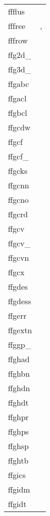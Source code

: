 \documentclass[11pt]{book}
\begin{document}
\begin{tabular}{lr}
ffflus     & \pageref{ffflus} \\
fffree     & \pageref{ffgkls},  \pageref{ffhdr2str} \\
fffrow    & \pageref{fffrow} \\
ffg2d\_      & \pageref{ffg2dx} \\
ffg3d\_      & \pageref{ffg3dx} \\
ffgabc      & \pageref{ffgabc} \\
ffgacl  & \pageref{ffgacl} \\
ffgbcl  & \pageref{ffgbcl} \\
ffgcdw  & \pageref{ffgcdw} \\
ffgcf    & \pageref{ffgcf} \\
ffgcf\_    & \pageref{ffgcfx} \\
ffgcks     & \pageref{ffgcks} \\
ffgcnn    & \pageref{ffgcnn} \\
ffgcno     & \pageref{ffgcno} \\
ffgcrd         & \pageref{ffgcrd} \\
ffgcv        & \pageref{ffgcv} \\
ffgcv\_    & \pageref{ffgcvx} \\
ffgcvn       & \pageref{ffgcvn} \\
ffgcx     & \pageref{ffgcx} \\
ffgdes & \pageref{ffgdes} \\
ffgdess & \pageref{ffgdes} \\
ffgerr  & \pageref{ffgerr} \\
ffgextn        & \pageref{ffgextn} \\
ffggp\_  & \pageref{ffggpx} \\
ffghad    & \pageref{ffghad} \\
ffghbn      & \pageref{ffghbn} \\
ffghdn    & \pageref{ffghdn} \\
ffghdt   & \pageref{ffghdt} \\
ffghpr       & \pageref{ffghpr} \\
ffghps        & \pageref{ffghps} \\
ffghsp      & \pageref{ffghsp} \\
ffghtb      & \pageref{ffghtb} \\
ffgics & \pageref{ffgics} \\
ffgidm & \pageref{ffgidm} \\
ffgidt & \pageref{ffgidt} \\

\end{tabular}
\end{document}
